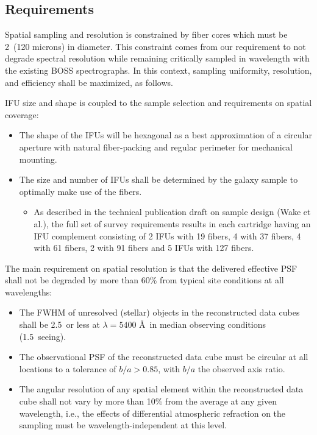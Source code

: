 \documentclass[preprint,11pt]{aastex}
\begin{document}
\subsection{Requirements}

Spatial sampling and resolution is constrained by fiber cores which
must be 2\arcsec\ (120 microns) in diameter. This constraint comes
from our requirement to not degrade spectral resolution while
remaining critically sampled in wavelength with the existing BOSS
spectrographs. In this context, sampling uniformity, resolution, and
efficiency shall be maximized, as follows.

\noindent IFU size and shape is coupled to the sample selection and requirements
on spatial coverage:

\begin{itemize}

\item The shape of the IFUs will be hexagonal as a best approximation
  of a circular aperture with natural fiber-packing and regular
  perimeter for mechanical mounting.

\item The size and number of IFUs shall be determined by the galaxy
  sample to optimally make use of the fibers.

\begin{itemize}

\item As described in the technical publication draft on sample design (Wake et al.), 
the full set of survey requirements
  results in each cartridge having an IFU complement consisting of 2
  IFUs with 19 fibers, 4 with 37 fibers, 4 with 61 fibers, 2 with 91
  fibers and 5 IFUs with 127 fibers.


\end{itemize}
\end{itemize}

\medskip
\noindent The main requirement on spatial resolution is that the delivered effective PSF shall not be degraded by more than 60\% from typical site conditions at all wavelengths:

\begin{itemize}

\item The FWHM of unresolved (stellar) objects in the reconstructed data
  cubes shall be 2.5\arcsec\ or less at $\lambda = 5400$ \AA\ in median
  observing conditions (1.5\arcsec\ seeing).

\item The observational PSF of the reconstructed data cube must be
  circular at all locations to a tolerance of $b/a > 0.85$, with $b/a$
  the observed axis ratio.

\item The angular resolution of any spatial element within the
  reconstructed data cube shall not vary by more than 10\% from the
  average at any given wavelength, i.e., the effects of differential
  atmospheric refraction on the sampling must be
  wavelength-independent at this level.

\end{itemize}
\end{document}

